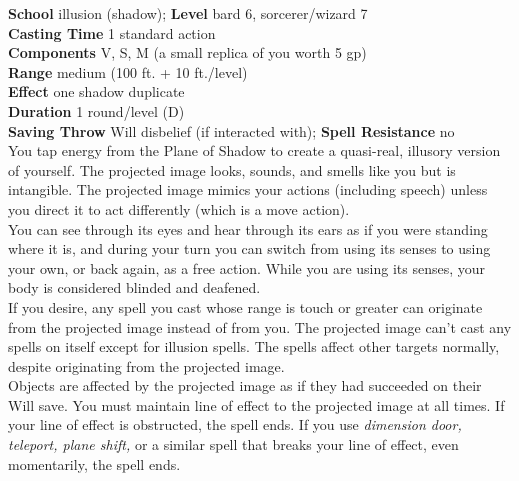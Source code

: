\textbf{School} illusion (shadow); \textbf{Level} bard 6, sorcerer/wizard 7\\
\textbf{Casting Time} 1 standard action\\
\textbf{Components} V, S, M (a small replica of you worth 5 gp)\\
\textbf{Range} medium (100 ft. + 10 ft./level)\\
\textbf{Effect} one shadow duplicate\\
\textbf{Duration} 1 round/level (D)\\
\textbf{Saving Throw }Will disbelief (if interacted with); \textbf{Spell Resistance} no\\
You tap energy from the Plane of Shadow to create a quasi-real, illusory version of yourself. The projected image looks, sounds, and smells like you but is intangible. The projected image mimics your actions (including speech) unless you direct it to act differently (which is a move action).\\
You can see through its eyes and hear through its ears as if you were standing where it is, and during your turn you can switch from using its senses to using your own, or back again, as a free action. While you are using its senses, your body is considered blinded and deafened.\\
If you desire, any spell you cast whose range is touch or greater can originate from the projected image instead of from you. The projected image can't cast any spells on itself except for illusion spells. The spells affect other targets normally, despite originating from the projected image.\\
Objects are affected by the projected image as if they had succeeded on their Will save. You must maintain line of effect to the projected image at all times. If your line of effect is obstructed, the spell ends. If you use \textit{dimension door, teleport, plane shift, }or a similar spell that breaks your line of effect, even momentarily, the spell ends.\\
